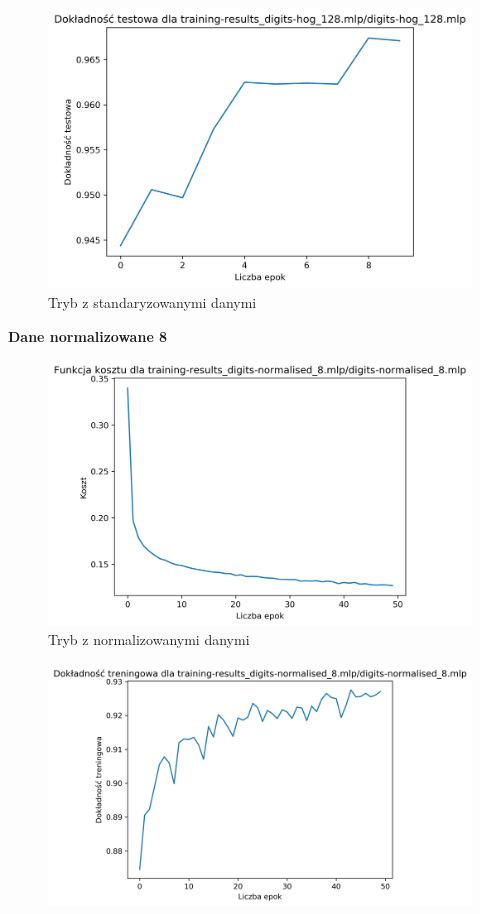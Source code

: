 \documentclass{classrep}
\begin{document}
{{{                \begin{figure}[!htbp]
                    \centering
                    \includegraphics[width=145mm]{wykresy/digits-hog_128_mlp_testing-accuracy.png}
                    \caption{Tryb z standaryzowanymi danymi}
                \end{figure}
                \FloatBarrier
                \textbf{Dane normalizowane 8}
                \begin{figure}[!htbp]
                    \centering
                    \includegraphics[width=145mm]{wykresy/digits-normalised_8_mlp_cost.png}
                    \caption{Tryb z normalizowanymi danymi}
                \end{figure}
                \begin{figure}[!htbp]
                    \centering
                    \includegraphics[width=155mm]{wykresy/digits-normalised_8_mlp_training-accuracy.png}

\end{figure}}}}
\end{document}
